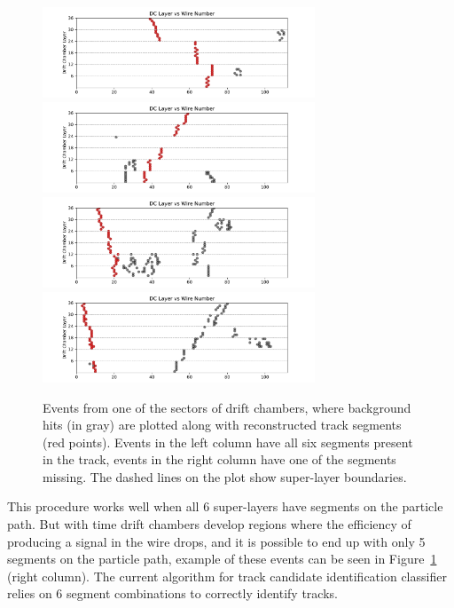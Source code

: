 \documentclass[12pt]{article}
\begin{document}
\begin{figure}[!ht]
\begin{center}
 \includegraphics[width=3.2in]{images/figure_raw_20.pdf}
 \includegraphics[width=3.2in]{images/figure_raw_22.pdf}
  \includegraphics[width=3.2in]{images/figure_raw_21.pdf}
   \includegraphics[width=3.2in]{images/figure_raw_23.pdf}
\caption {Events from one of the sectors of drift chambers, where background hits (in gray) are plotted along with 
reconstructed track segments (red points). Events in the left column have all six segments present in the track, events
in the right column have one of the segments missing. The dashed lines on the plot show super-layer boundaries.}
 \label{dc:display}
 \end{center}
\end{figure}

This procedure works well when all 6 super-layers have segments on the particle path. But with time drift chambers develop regions where the efficiency of producing a signal in the wire drops, and it is possible to end up with only 5 segments on the particle path, example of these events can be seen in Figure~\ref{dc:display} (right column). The current algorithm for track candidate identification classifier relies on 6 segment combinations to correctly identify tracks.
\end{document}
